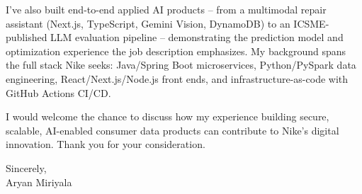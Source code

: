 \documentclass[letterpaper,11pt]{article}
\begin{document}
\vspace{8pt}

I've also built end-to-end applied AI products -- from a multimodal repair assistant (Next.js, TypeScript, Gemini Vision, DynamoDB) to an ICSME-published LLM evaluation pipeline -- demonstrating the prediction model and optimization experience the job description emphasizes. My background spans the full stack Nike seeks: Java/Spring Boot microservices, Python/PySpark data engineering, React/Next.js/Node.js front ends, and infrastructure-as-code with GitHub Actions CI/CD.

\vspace{8pt}

I would welcome the chance to discuss how my experience building secure, scalable, AI-enabled consumer data products can contribute to Nike's digital innovation. Thank you for your consideration.

\vspace{16pt}

Sincerely,\\[8pt]

Aryan Miriyala
\end{document}
